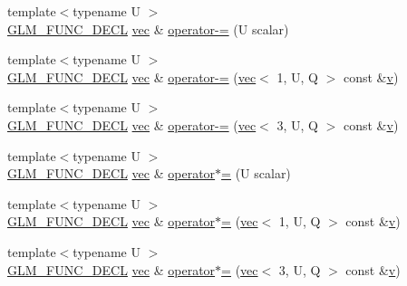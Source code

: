 \begin{DoxyCompactItemize}
\item 
{\footnotesize template$<$typename U $>$ }\\\mbox{\hyperlink{setup_8hpp_ab2d052de21a70539923e9bcbf6e83a51}{G\+L\+M\+\_\+\+F\+U\+N\+C\+\_\+\+D\+E\+CL}} \mbox{\hyperlink{structglm_1_1vec}{vec}} \& \mbox{\hyperlink{structglm_1_1vec_3_013_00_01_t_00_01_q_01_4_a095c0fe97fff65c3ef77bdb0c41a747f}{operator-\/=}} (U scalar)
\item 
{\footnotesize template$<$typename U $>$ }\\\mbox{\hyperlink{setup_8hpp_ab2d052de21a70539923e9bcbf6e83a51}{G\+L\+M\+\_\+\+F\+U\+N\+C\+\_\+\+D\+E\+CL}} \mbox{\hyperlink{structglm_1_1vec}{vec}} \& \mbox{\hyperlink{structglm_1_1vec_3_013_00_01_t_00_01_q_01_4_a9b8dba9adb57ad50b1f22fdf3864407e}{operator-\/=}} (\mbox{\hyperlink{structglm_1_1vec}{vec}}$<$ 1, U, Q $>$ const \&\mbox{\hyperlink{_s_d_l__opengl_8h_a10a82eabcb59d2fcd74acee063775f90}{v}})
\item 
{\footnotesize template$<$typename U $>$ }\\\mbox{\hyperlink{setup_8hpp_ab2d052de21a70539923e9bcbf6e83a51}{G\+L\+M\+\_\+\+F\+U\+N\+C\+\_\+\+D\+E\+CL}} \mbox{\hyperlink{structglm_1_1vec}{vec}} \& \mbox{\hyperlink{structglm_1_1vec_3_013_00_01_t_00_01_q_01_4_af172872e811a8262f44dc83a9784354e}{operator-\/=}} (\mbox{\hyperlink{structglm_1_1vec}{vec}}$<$ 3, U, Q $>$ const \&\mbox{\hyperlink{_s_d_l__opengl_8h_a10a82eabcb59d2fcd74acee063775f90}{v}})
\item 
{\footnotesize template$<$typename U $>$ }\\\mbox{\hyperlink{setup_8hpp_ab2d052de21a70539923e9bcbf6e83a51}{G\+L\+M\+\_\+\+F\+U\+N\+C\+\_\+\+D\+E\+CL}} \mbox{\hyperlink{structglm_1_1vec}{vec}} \& \mbox{\hyperlink{structglm_1_1vec_3_013_00_01_t_00_01_q_01_4_aba701d21d6bd3d13abf30c01af0578a5}{operator$\ast$=}} (U scalar)
\item 
{\footnotesize template$<$typename U $>$ }\\\mbox{\hyperlink{setup_8hpp_ab2d052de21a70539923e9bcbf6e83a51}{G\+L\+M\+\_\+\+F\+U\+N\+C\+\_\+\+D\+E\+CL}} \mbox{\hyperlink{structglm_1_1vec}{vec}} \& \mbox{\hyperlink{structglm_1_1vec_3_013_00_01_t_00_01_q_01_4_ab92a53416987503f1fcf90654e0512fd}{operator$\ast$=}} (\mbox{\hyperlink{structglm_1_1vec}{vec}}$<$ 1, U, Q $>$ const \&\mbox{\hyperlink{_s_d_l__opengl_8h_a10a82eabcb59d2fcd74acee063775f90}{v}})
\item 
{\footnotesize template$<$typename U $>$ }\\\mbox{\hyperlink{setup_8hpp_ab2d052de21a70539923e9bcbf6e83a51}{G\+L\+M\+\_\+\+F\+U\+N\+C\+\_\+\+D\+E\+CL}} \mbox{\hyperlink{structglm_1_1vec}{vec}} \& \mbox{\hyperlink{structglm_1_1vec_3_013_00_01_t_00_01_q_01_4_a6ac07056cd1518270e77cdcce4fb3fe5}{operator$\ast$=}} (\mbox{\hyperlink{structglm_1_1vec}{vec}}$<$ 3, U, Q $>$ const \&\mbox{\hyperlink{_s_d_l__opengl_8h_a10a82eabcb59d2fcd74acee063775f90}{v}})

\end{DoxyCompactItemize}
